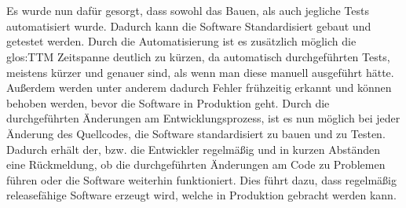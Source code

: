 \\\\
Es wurde nun dafür gesorgt, dass sowohl das Bauen, als auch jegliche Tests automatisiert wurde. Dadurch kann die Software Standardisiert gebaut und getestet werden. Durch die Automatisierung ist es zusätzlich möglich die \gls{glos:TTM} Zeitspanne deutlich zu kürzen, da automatisch durchgeführten Tests, meistens kürzer und genauer sind, als wenn man diese manuell ausgeführt hätte. Außerdem werden unter anderem dadurch Fehler frühzeitig erkannt und können behoben werden, bevor die Software in Produktion geht. Durch die durchgeführten Änderungen am Entwicklungsprozess, ist es nun möglich bei jeder Änderung des Quellcodes, die Software standardisiert zu bauen und zu Testen. Dadurch erhält der, bzw. die Entwickler regelmäßig und in kurzen Abständen eine Rückmeldung, ob die durchgeführten Änderungen am Code zu Problemen führen oder die Software weiterhin funktioniert. Dies führt dazu, dass regelmäßig releasefähige Software erzeugt wird, welche in Produktion gebracht werden kann.